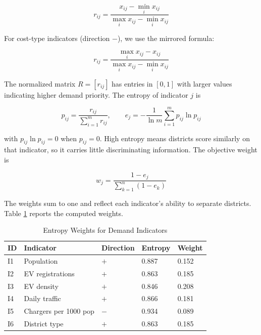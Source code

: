 \documentclass[12pt]{article}
\begin{document}
\begin{equation}
r_{ij} = \frac{x_{ij} - \min_i x_{ij}}{\max_i x_{ij} - \min_i x_{ij}}
\end{equation}

For cost-type indicators (direction $-$), we use the mirrored formula:

\begin{equation}
r_{ij} = \frac{\max_i x_{ij} - x_{ij}}{\max_i x_{ij} - \min_i x_{ij}}
\end{equation}

The normalized matrix $R = [r_{ij}]$ has entries in $[0,1]$ with larger values indicating
higher demand priority. The entropy of indicator $j$ is

\begin{equation}
p_{ij} = \frac{r_{ij}}{\sum_{i=1}^m r_{ij}}, \qquad
e_j = -\frac{1}{\ln m}\sum_{i=1}^m p_{ij}\ln p_{ij}
\end{equation}

with $p_{ij}\ln p_{ij}=0$ when $p_{ij}=0$. High entropy means districts score similarly on
that indicator, so it carries little discriminating information. The objective weight is

\begin{equation}
w_j = \frac{1 - e_j}{\sum_{k=1}^n (1 - e_k)}
\end{equation}

The weights sum to one and reflect each indicator's ability to separate districts.
Table \ref{tab:weights} reports the computed weights.

\begin{table}[H]
\centering
\caption{Entropy Weights for Demand Indicators}
\label{tab:weights}
\renewcommand{\arraystretch}{0.95}
\begin{tabular}{@{}p{}p{}p{}p{}p{}@{}}
\toprule
ID & Indicator & Direction & Entropy & Weight \\
\midrule
I1 & Population & $+$ & 0.887 & 0.152 \\
I2 & EV registrations & $+$ & 0.863 & 0.185 \\
I3 & EV density & $+$ & 0.846 & 0.208 \\
I4 & Daily traffic & $+$ & 0.866 & 0.181 \\
I5 & Chargers per 1000 pop & $-$ & 0.934 & 0.089 \\
I6 & District type & $+$ & 0.863 & 0.185 \\
\bottomrule
\end{tabular}
\end{table}
\end{document}
